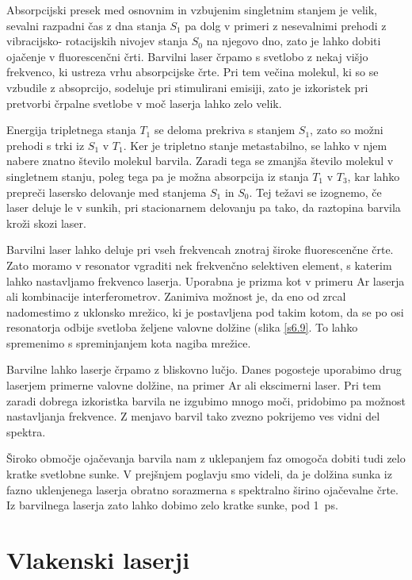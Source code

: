 Absorpcijski presek med osnovnim in vzbujenim singletnim stanjem je velik,
sevalni razpadni čas z dna stanja $S_1$ pa dolg v primeri z nesevalnimi
prehodi z vibracijsko- rotacijskih nivojev stanja $S_0$ na njegovo dno, zato
je lahko dobiti ojačenje v fluorescenčni črti. Barvilni laser črpamo s
svetlobo z nekaj višjo frekvenco, ki ustreza vrhu absorpcijske črte. Pri
tem večina molekul, ki so se vzbudile z absoprcijo, sodeluje pri
stimulirani emisiji, zato je izkoristek pri pretvorbi črpalne svetlobe v
moč laserja lahko zelo velik.

Energija tripletnega stanja $T_1$ se deloma prekriva s stanjem $S_1$, zato
so možni prehodi s trki iz $S_1$ v $T_1$. Ker je tripletno stanje
metastabilno, se lahko v njem nabere znatno število molekul barvila. Zaradi
tega se zmanjša število molekul v singletnem stanju, poleg tega pa je
možna absorpcija iz stanja $T_1$ v $T_3$, kar lahko prepreči lasersko
delovanje med stanjema $S_1$ in $S_0$. Tej težavi se izognemo, če laser
deluje le v sunkih, pri stacionarnem delovanju pa tako, da raztopina barvila
kroži skozi laser.

Barvilni laser lahko deluje pri vseh frekvencah znotraj široke
fluorescenčne črte. Zato moramo v resonator vgraditi nek frekvenčno
selektiven element, s katerim lahko nastavljamo frekvenco laserja. Uporabna
je prizma kot v primeru Ar laserja ali kombinacije interferometrov. Zanimiva
možnost je, da eno od zrcal nadomestimo z uklonsko mrežico, ki je
postavljena pod takim kotom, da se po osi resonatorja odbije svetloba
željene valovne dolžine (slika \ref{s6.9}. To lahko spremenimo s
spreminjanjem kota nagiba mrežice.

Barvilne lahko laserje črpamo z bliskovno lučjo. Danes pogosteje uporabimo
drug laserjem primerne valovne dolžine, na primer Ar ali ekscimerni laser.
Pri tem zaradi dobrega izkoristka barvila ne izgubimo mnogo moči, pridobimo
pa možnost nastavljanja frekvence. Z menjavo barvil tako zvezno pokrijemo
ves vidni del spektra.

Široko območje ojačevanja barvila nam z uklepanjem faz omogoča dobiti
tudi zelo kratke svetlobne sunke. V prejšnjem poglavju smo videli, da je
dolžina sunka iz fazno uklenjenega laserja obratno sorazmerna s spektralno
širino ojačevalne črte. Iz barvilnega laserja zato lahko dobimo zelo
kratke sunke, pod 1~ps.
 
\section{Vlakenski laserji}
